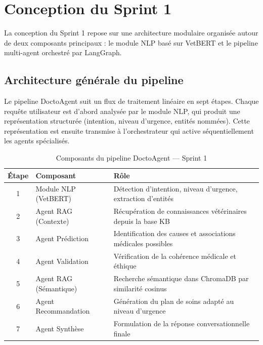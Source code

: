 \section{Conception du Sprint 1}

La conception du Sprint 1 repose sur une architecture modulaire organisée autour de deux composants principaux : le module NLP basé sur VetBERT et le pipeline multi-agent orchestré par LangGraph.

\subsection{Architecture générale du pipeline}

Le pipeline DoctoAgent suit un flux de traitement linéaire en sept étapes. Chaque requête utilisateur est d'abord analysée par le module NLP, qui produit une représentation structurée (intention, niveau d'urgence, entités nommées). Cette représentation est ensuite transmise à l'orchestrateur qui active séquentiellement les agents spécialisés.

\begin{table}[H]
\centering
\caption{Composants du pipeline DoctoAgent — Sprint 1}
\label{tab:pipeline-components}
\renewcommand{\arraystretch}{1.4}
\begin{tabular}{|c|l|p{9cm}|}
\hline
\textbf{Étape} & \textbf{Composant} & \textbf{Rôle} \\
\hline
1 & Module NLP (VetBERT)     & Détection d'intention, niveau d'urgence, extraction d'entités \\
\hline
2 & Agent RAG (Contexte)     & Récupération de connaissances vétérinaires depuis la base KB \\
\hline
3 & Agent Prédiction         & Identification des causes et associations médicales possibles \\
\hline
4 & Agent Validation         & Vérification de la cohérence médicale et éthique \\
\hline
5 & Agent RAG (Sémantique)   & Recherche sémantique dans ChromaDB par similarité cosinus \\
\hline
6 & Agent Recommandation     & Génération du plan de soins adapté au niveau d'urgence \\
\hline
7 & Agent Synthèse           & Formulation de la réponse conversationnelle finale \\
\hline
\end{tabular}
\end{table}

